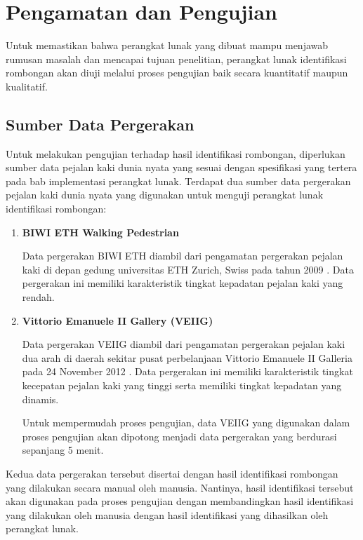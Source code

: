 \chapter{Pengamatan dan Pengujian}
\label{chap:pengujian}

Untuk memastikan bahwa perangkat lunak yang dibuat mampu menjawab rumusan masalah dan mencapai tujuan penelitian, perangkat lunak identifikasi rombongan akan diuji melalui proses pengujian baik secara kuantitatif maupun kualitatif.

\section{Sumber Data Pergerakan}
\label{bab6:data-pergerakan}

Untuk melakukan pengujian terhadap hasil identifikasi rombongan, diperlukan sumber data pejalan kaki dunia nyata yang sesuai dengan spesifikasi yang tertera pada bab implementasi perangkat lunak. Terdapat dua sumber data pergerakan pejalan kaki dunia nyata yang digunakan untuk menguji perangkat lunak identifikasi rombongan:

\begin{enumerate}
    \item \textbf{BIWI ETH Walking Pedestrian}
    
    Data pergerakan BIWI ETH diambil dari pengamatan pergerakan pejalan kaki di depan gedung universitas ETH Zurich, Swiss pada tahun 2009 \cite{pellegrini:eth}. Data pergerakan ini memiliki karakteristik tingkat kepadatan pejalan kaki yang rendah.
    
    \item \textbf{Vittorio Emanuele II Gallery (VEIIG)}
    
    Data pergerakan VEIIG diambil dari pengamatan pergerakan pejalan kaki dua arah di daerah sekitar pusat perbelanjaan Vittorio Emanuele II Galleria pada 24 November 2012 \cite{bandini:gveii}. Data pergerakan ini memiliki karakteristik tingkat kecepatan pejalan kaki yang tinggi serta memiliki tingkat kepadatan yang dinamis.
    
    Untuk mempermudah proses pengujian, data VEIIG yang digunakan dalam proses pengujian akan dipotong menjadi data pergerakan yang berdurasi sepanjang 5 menit.
\end{enumerate}

Kedua data pergerakan tersebut disertai dengan hasil identifikasi rombongan yang dilakukan secara manual oleh manusia. Nantinya, hasil identifikasi tersebut akan digunakan pada proses pengujian dengan membandingkan hasil identifikasi yang dilakukan oleh manusia dengan hasil identifikasi yang dihasilkan oleh perangkat lunak.

